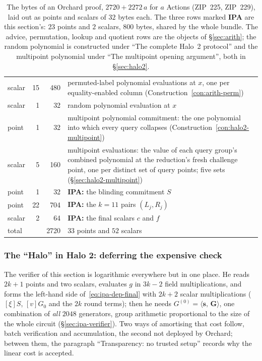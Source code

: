 \documentclass[11pt,a4paper]{article}
\theoremstyle{definition}
\newcommand{\ip}[2]{\langle #1,\, #2 \rangle}
\begin{document}
\begin{table}[htbp]
\begin{tabular}{l r r p{8.6cm}}
scalar & 15 & 480 & permuted-label polynomial evaluations at $x$, one per
  equality-enabled column (Construction~\ref{con:arith-perm}) \\
scalar &  1 &  32 & random polynomial evaluation at $x$ \\
point  &  1 &  32 & multipoint polynomial commitment: the one polynomial
  into which every query collapses (Construction~\ref{con:halo2-multipoint}) \\
scalar &  5 & 160 & multipoint evaluations: the value of each query
  group's combined polynomial at the reduction's fresh challenge point,
  one per distinct set of query points; five sets
  (\S\ref{sec:halo2-multipoint}) \\
point  &  1 &  32 & \textbf{IPA:} the blinding commitment $S$ \\
point  & 22 & 704 & \textbf{IPA:} the $k = 11$ pairs $(L_j, R_j)$ \\
scalar &  2 &  64 & \textbf{IPA:} the final scalars $c$ and $f$ \\
\multicolumn{2}{l}{total} & 2720 & $33$ points and $52$ scalars \\
\bottomrule
\end{tabular}
\caption{The bytes of an Orchard proof, $2720 + 2272\,a$ for $a$
Actions (ZIP~225, ZIP~229), laid out as points and scalars of $32$ bytes each.
The three rows marked \textbf{IPA} are
this section's: $23$ points and $2$ scalars, $800$ bytes, shared by the
whole bundle. The advice, permutation, lookup and quotient rows are the
objects of \S\ref{sec:arith}; the random polynomial is constructed under
``The complete Halo~2 protocol'' and the multipoint polynomial under ``The
multipoint opening argument'', both in \S\ref{sec:halo2}.}
\label{tab:proof-bytes}
\end{table}

\subsubsection{The ``Halo'' in Halo 2: deferring the expensive check}
\label{sec:ipa-halo-trick}

The verifier of this section is logarithmic everywhere but in one
place. He reads $2k + 1$ points and two scalars, evaluates $g$ in
$3k - 2$ field multiplications, and forms the left-hand side
of~\eqref{eq:ipa-dep-final} with $2k + 2$ scalar multiplications
($[\xi]S$, $[v]G_0$ and the $2k$ round terms); then he needs
$G^{(0)} = \ip{\mathbf s}{\mathbf G}$, one combination of \emph{all}
$2048$ generators, group arithmetic proportional to the size of the
whole circuit (\S\ref{sec:ipa-verifier}). Two ways of amortising that cost
follow, batch verification and accumulation, the second not deployed by
Orchard; between them, the paragraph ``Transparency: no trusted setup''
records why the linear cost is accepted.
\end{document}
